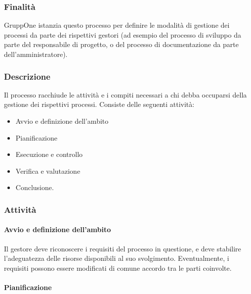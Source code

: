 \documentclass[../../norme-di-progetto.tex]{subfiles}
\begin{document}
\subsubsection{Finalità}%
\label{subs:gestione-di-processo/finalita}

GruppOne istanzia questo processo per definire le modalità di gestione dei processi da parte dei rispettivi gestori (ad esempio del processo di sviluppo da parte del responsabile di progetto, o del processo di documentazione da parte dell'amministratore).

\subsubsection{Descrizione}%
\label{subs:gestione-di-processo/descrizione}

Il processo racchiude le attività e i compiti necessari a chi debba occuparsi della gestione dei rispettivi processi.
Consiste delle seguenti attività:
\begin{itemize}
  \item Avvio e definizione dell'ambito
  \item Pianificazione
  \item Esecuzione e controllo
  \item Verifica e valutazione
  \item Conclusione.
\end{itemize}

\subsubsection{Attività}%
\label{subs:gestione-di-processo/attivita}

\paragraph{Avvio e definizione dell'ambito}%
\label{par:avvio_e_definizione_dell'ambito}

Il gestore deve riconoscere i requisiti del processo in questione, e deve stabilire l'adeguatezza delle risorse disponibili al suo svolgimento. Eventualmente, i requisiti possono essere modificati di comune accordo tra le parti coinvolte.

\paragraph{Pianificazione}%
\label{par:gestione-di-processo/pianificazione}
\end{document}
